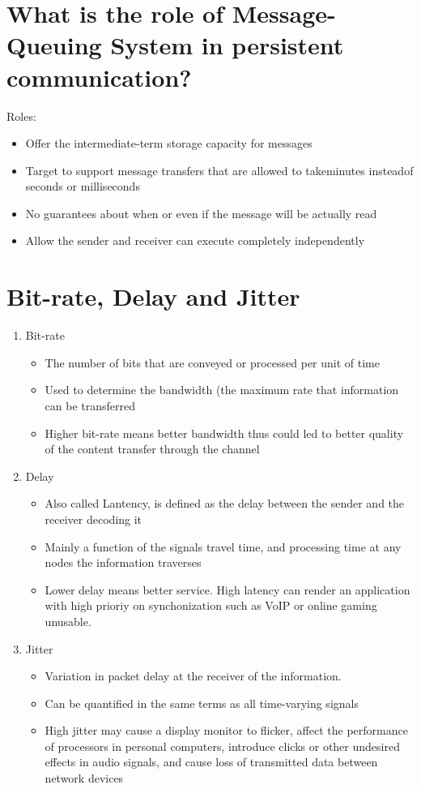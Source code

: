 \documentclass[11pt,a4paper]{article}
\begin{document}
	\section{What is the role of Message-Queuing System in persistent communication?}
	Roles:
	\begin{itemize}
		\item Offer the intermediate-term storage capacity for messages
		\item Target to support message transfers that are allowed to takeminutes insteadof seconds or milliseconds
		\item No guarantees about when or even if the message will be actually read
		\item Allow the sender and receiver can execute completely independently
	\end{itemize}
	
	\section{Bit-rate, Delay and Jitter}
	\begin{enumerate}
		\item Bit-rate
			\begin{itemize}
				\item The number of bits that are conveyed or processed per unit of time
				\item Used to determine the bandwidth (the maximum rate that information can be transferred
				\item Higher bit-rate means better bandwidth thus could led to better quality of the content transfer through the channel
			\end{itemize}
		\item Delay
			\begin{itemize}
				\item Also called Lantency, is defined as the delay between the sender and the receiver decoding it
				\item Mainly a function of the signals travel time, and processing time at any nodes the information traverses
				\item Lower delay means better service. High latency can render an application with high prioriy on synchonization such as VoIP or online gaming unusable.
			\end{itemize}
		\item Jitter
			\begin{itemize}
				\item Variation in packet delay at the receiver of the information.
				\item Can be quantified in the same terms as all time-varying signals
				\item High jitter may cause a display monitor to flicker, affect the performance of processors in personal computers, introduce clicks or other undesired effects in audio signals, and cause loss of transmitted data between network devices
			\end{itemize}
	\end{enumerate}
	
\end{document}

